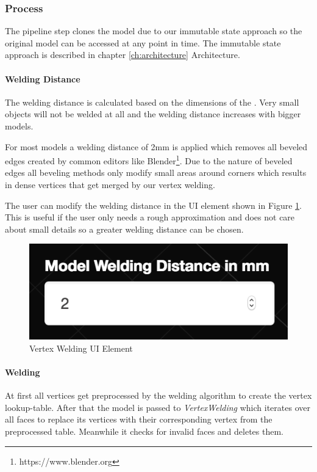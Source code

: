 \documentclass[../ClassicThesis.tex]{subfiles}
\begin{document}
\subsubsection{Process}

The pipeline step clones the model due to our immutable state approach so the original model can be accessed at any point in time. The immutable state approach is described in chapter \ref{ch:architecture} Architecture.


\paragraph{Welding Distance}

The welding distance is calculated based on the dimensions of the {\threedmodel}. Very small objects will not be welded at all and the welding distance increases with bigger models.

For most models a welding distance of 2mm is applied which removes all beveled edges created by common editors like Blender\footnote{https://www.blender.org}. Due to the nature of beveled edges all beveling methods only modify small areas around corners which results in dense vertices that get merged by our vertex welding.

The user can modify the welding distance in the UI element shown in Figure \ref{fig:weldingUI}. This is useful if the user only needs a rough approximation and does not care about small details so a greater welding distance can be chosen.

\begin{figure}
\includegraphics[width=0.5\columnwidth]{Images/04-approx-weldingUI.png}
\caption{Vertex Welding UI Element}
\label{fig:weldingUI}
\end{figure}



\paragraph{Welding}

At first all vertices get preprocessed by the welding algorithm to create the vertex lookup-table. After that the model is passed to \emph{VertexWelding} which iterates over all faces to replace its vertices with their corresponding vertex from the preprocessed table. Meanwhile it checks for invalid faces and deletes them.
\end{document}
